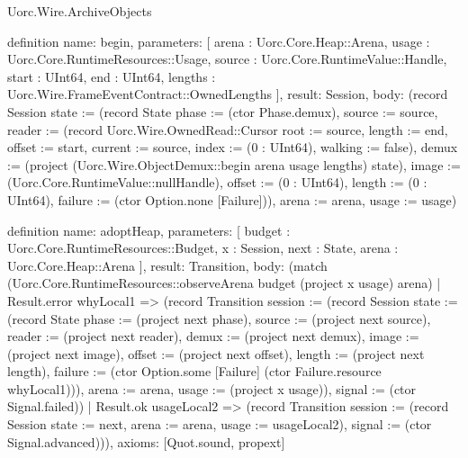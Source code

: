 \begin{lexlean}{Uorc.Wire.ArchiveObjects}
\begin{semanticmodule}
definition{
  name: begin,
  parameters: [
    arena : Uorc.Core.Heap::Arena,
    usage : Uorc.Core.RuntimeResources::Usage,
    source : Uorc.Core.RuntimeValue::Handle,
    start : UInt64,
    end : UInt64,
    lengths : Uorc.Wire.FrameEventContract::OwnedLengths
  ],
  result: Session,
  body: (record Session {state := (record State {phase := (ctor Phase.demux), source := source, reader := (record Uorc.Wire.OwnedRead::Cursor {root := source, length := end, offset := start, current := source, index := (0 : UInt64), walking := false}), demux := (project (Uorc.Wire.ObjectDemux::begin arena usage lengths) state), image := (Uorc.Core.RuntimeValue::nullHandle), offset := (0 : UInt64), length := (0 : UInt64), failure := (ctor Option.none [Failure])}), arena := arena, usage := usage})
}

definition{
  name: adoptHeap,
  parameters: [
    budget : Uorc.Core.RuntimeResources::Budget,
    x : Session,
    next : State,
    arena : Uorc.Core.Heap::Arena
  ],
  result: Transition,
  body: (match (Uorc.Core.RuntimeResources::observeArena budget (project x usage) arena)
    | Result.error whyLocal1 => (record Transition {session := (record Session {state := (record State {phase := (project next phase), source := (project next source), reader := (project next reader), demux := (project next demux), image := (project next image), offset := (project next offset), length := (project next length), failure := (ctor Option.some [Failure] (ctor Failure.resource whyLocal1))}), arena := arena, usage := (project x usage)}), signal := (ctor Signal.failed)})
    | Result.ok usageLocal2 => (record Transition {session := (record Session {state := next, arena := arena, usage := usageLocal2}), signal := (ctor Signal.advanced)})),
  axioms: [Quot.sound, propext]
}


\end{semanticmodule}
\end{lexlean}
